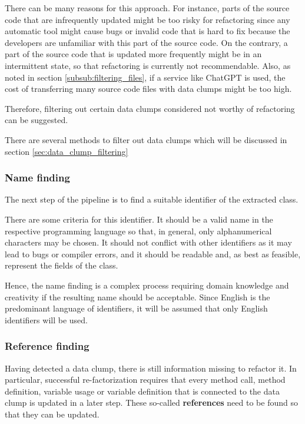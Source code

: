There can be many reasons for this approach. For instance, parts of the source code that are infrequently updated might be too risky for refactoring since any automatic tool might cause bugs or invalid code that is hard to fix because the developers are unfamiliar with this part of the source code. On the contrary, a part of the source code that is updated more frequently might be in an intermittent state, so that refactoring is currently not recommendable. Also, as noted in section  \ref{subsub:filtering_files}, if a service like ChatGPT is used, the cost of transferring many source code files with data clumps might be too high. 


Therefore, filtering out certain data clumps considered not worthy of refactoring can be suggested.

There are several methods to filter out data clumps which will be discussed in section \ref{sec:data_clump_filtering}

\subsubsection{Name finding}\label{subsec:chap3_data_clump_name_finding}
The next step of the pipeline is to find a suitable identifier of the extracted class.

There are some criteria for this identifier. It should be a valid name in the respective programming language so that, in general, only alphanumerical characters may be chosen. It should not conflict with other identifiers as it may lead to bugs or compiler errors, and it should be readable and, as best as feasible, represent the fields of the class.

Hence, the name finding is a complex process requiring domain knowledge and creativity if the resulting name should be acceptable. 
Since English is the predominant language of identifiers, it will be assumed that only English identifiers will be used. 

\subsubsection{Reference finding}
 Having detected a data clump, there is still information missing to refactor it. In particular, successful re-factorization requires that every method call, method definition, variable usage or variable definition that is connected to the data clump is updated in a later step. These so-called \textbf{references} need to be found so that they can be updated.

